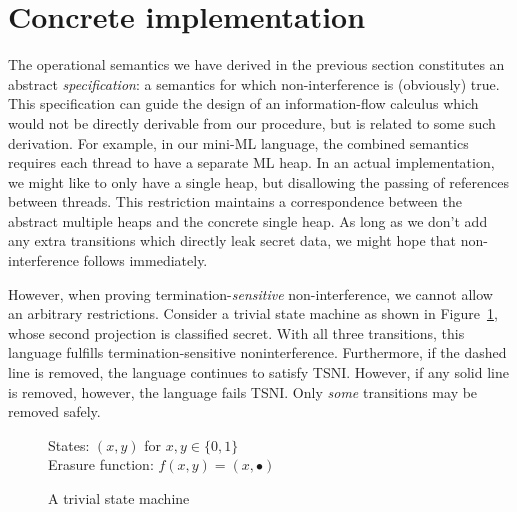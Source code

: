 \section{Concrete implementation}
\label{sec:concrete}

The operational semantics we have derived in the previous section
constitutes an abstract \emph{specification}: a semantics for which
non-interference is (obviously) true.  This specification can guide the
design of an information-flow calculus which would not be directly
derivable from our procedure, but is related to some such derivation.
For example, in our mini-ML language, the combined semantics requires
each thread to have a separate ML heap.  In an actual implementation, we
might like to only have a single heap, but disallowing the
passing of references between threads.  This restriction maintains a
correspondence between the abstract multiple heaps and the concrete
single heap.  As long as we don't add any extra transitions which directly
leak secret data, we might hope that non-interference follows
immediately.

However, when proving termination-\emph{sensitive} non-interference, we
cannot allow an arbitrary restrictions.  Consider a trivial state
machine as shown in Figure~\ref{fig:trivial-sm}, whose second projection
is classified secret.  With all three transitions, this language
fulfills termination-sensitive noninterference.  Furthermore, if the
dashed line is removed, the language continues to satisfy TSNI.
However, if any solid line is removed, however, the language fails TSNI.
Only \emph{some} transitions may be removed safely.

\begin{figure}
    States: $(x,y)$ for $x,y \in \{0,1\}$ \\
    Erasure function: $f(x,y) = (x,\bullet)$

    \begin{center}\end{center}

    \label{fig:trivial-sm}
    \caption{A trivial state machine}
\end{figure}

